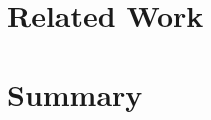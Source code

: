 \section{Related Work}
\label{sec:related-work}



\section{Summary}
\label{sec:background-summary}

